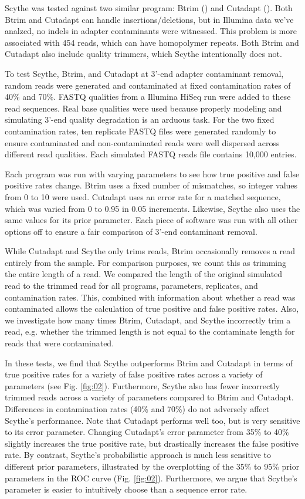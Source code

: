 \documentclass{bioinfo}
\begin{document}
\begin{methods}
Scythe was tested against two similar program: Btrim
(\citealp{pmid21651976}) and Cutadapt (\citealp{EJ200}). Both
Btrim and Cutadapt can handle insertions/deletions, but in Illumina
data we've analzed, no indels in adapter contaminants were
witnessed. This problem is more associated with 454 reads, which can
have homopolymer repeats. Both Btrim and Cutadapt also include quality
trimmers, which Scythe intentionally does not.

To test Scythe, Btrim, and Cutadapt at 3'-end adapter contaminant
removal, random reads were generated and contaminated at fixed
contamination rates of 40\% and 70\%. FASTQ qualities from a Illumina
HiSeq run were added to these read sequences. Real base qualities were
used because properly modeling and simulating 3'-end quality
degradation is an arduous task. For the two fixed contamination rates,
ten replicate FASTQ files were generated randomly to ensure
contaminated and non-contaminated reads were well dispersed across
different read qualities. Each simulated FASTQ reads file contains
10,000 entries.

Each program was run with varying parameters to see how true positive
and false positive rates change. Btrim uses a fixed number of
mismatches, so integer values from 0 to 10 were used. Cutadapt uses an
error rate for a matched sequence, which was varied from 0 to 0.95 in
0.05 increments. Likewise, Scythe also uses the same values for its
prior parameter. Each piece of software was run with all other options
off to ensure a fair comparison of 3'-end contaminant removal.

While Cutadapt and Scythe only trims reads, Btrim occasionally removes
a read entirely from the sample. For comparison purposes, we count
this as trimming the entire length of a read. We compared the length
of the original simulated read to the trimmed read for all programs,
parameters, replicates, and contamination rates. This, combined with
information about whether a read was contaminated allows the
calculation of true positive and false positive rates. Also, we
investigate how many times Btrim, Cutadapt, and Scythe incorrectly
trim a read, e.g. whether the trimmed length is not equal to the
contaminate length for reads that were contaminated.

In these tests, we find that Scythe outperforms Btrim and Cutadapt in
terms of true positive rates for a variety of false positive rates
across a variety of parameters (see Fig. \ref{fig:02}). Furthermore,
Scythe also has fewer incorrectly trimmed reads across a variety of
parameters compared to Btrim and Cutadapt. Differences in
contamination rates (40\% and 70\%) do not adversely affect Scythe's
performance. Note that Cutadapt performs well too, but is very
sensitive to its error parameter. Changing Cutadapt's error parameter
from 35\% to 40\% slightly increases the true positive rate, but
drastically increases the false positive rate. By contrast, Scythe's
probabilistic approach is much less sensitive to different prior
parameters, illustrated by the overplotting of the 35\% to 95\% prior
parameters in the ROC curve (Fig. \ref{fig:02}). Furthermore, we argue
that Scythe's parameter is easier to intuitively choose than a
sequence error rate.


\end{methods}
\end{document}
